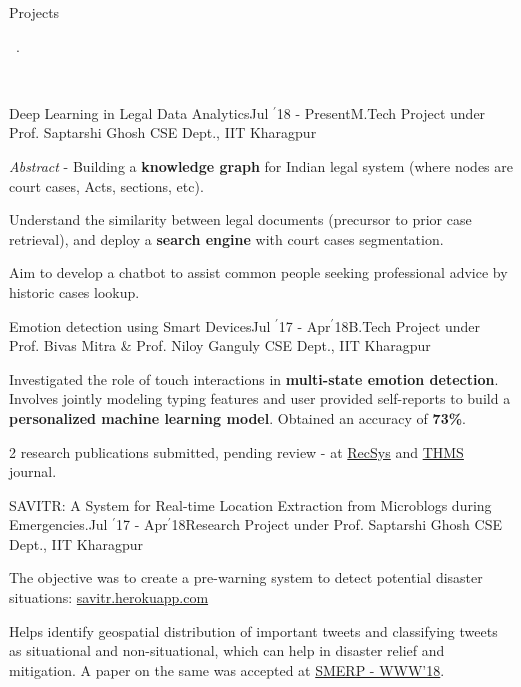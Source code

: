 \documentclass[11pt, a4paper]{resume}
\newcommand{\important}[1]{
  \textcolor{mypurple}{#1}
}
\newcommand{\fillit}[1]{
  \leavevmode\xleaders\hbox{#1}\hfill\kern0pt
}
\newcommand{\sectionSubtitleX}[1]{
  \begin{large}
    \important{#1}
    \end{large}
    \fillit{\important{.}}
}
\begin{document}
\sectionSubtitleX{Projects}
\\
\begin{rSubsection}{Deep Learning in Legal Data Analytics}{Jul $^{\prime}$18 - Present}{M.Tech Project under Prof. Saptarshi Ghosh}{\hspace*{\fill} CSE Dept., IIT Kharagpur}
\item \textit{Abstract} - Building a \textbf{knowledge graph} for Indian legal system (where nodes are court cases, Acts, sections, etc).
\item Understand the similarity between legal documents (precursor to prior case retrieval), and deploy a \textbf{search engine} with court cases segmentation.
\item Aim to develop a chatbot to assist common people seeking professional advice by historic cases lookup.
\end{rSubsection}

\begin{rSubsection}{Emotion detection using Smart Devices}{Jul $^{\prime}$17 - Apr$^{\prime}$18}{B.Tech Project under Prof. Bivas Mitra \& Prof. Niloy Ganguly}{\hspace*{\fill} CSE Dept., IIT Kharagpur}
\item Investigated the role of touch interactions in {\bf multi-state emotion detection}. Involves jointly modeling typing features and  user provided self-reports to build a {\bf personalized machine learning model}. Obtained an accuracy of {\bf 73\%}.
\item 2 research publications submitted, pending review - at \href{https://recsys.acm.org/recsys18/}{RecSys} and \href{http://www.ieeesmc.org/publications/transactions-on-human-machine-systems}{THMS} journal.
\end{rSubsection}

\begin{rSubsection}{SAVITR: A System for Real-time Location Extraction from Microblogs during Emergencies.}{Jul $^{\prime}$17 - Apr$^{\prime}$18}{Research Project under Prof. Saptarshi Ghosh}{\hspace*{\fill} CSE Dept., IIT Kharagpur}
\item The objective was to create a pre-warning system to detect potential disaster situations: \href{http://savitr.herokuapp.com}{savitr.herokuapp.com}
\item Helps identify geospatial distribution of important tweets and classifying tweets as situational and non-situational, which can help in disaster relief and mitigation. A paper on the same was accepted at \href{https://www.cse.iitk.ac.in/users/kripa/smerp2018/}{SMERP - WWW'18}.
\end{rSubsection}
\end{document}
